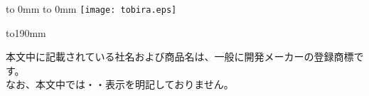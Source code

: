 %
\thispagestyle{empty}
\vbox to 0mm{\vspace*{-27.5truemm}
\hbox to 0mm{
\hspace*{-23.8truemm}\texttt{[image: tobira.eps]}
}\vss}


\pagebreak

%
\thispagestyle{frontheadings}

\vbox to190mm{
\vfil
\begin{minipage}[b]{112mm}
%
\begin{spacing}{1.0}
\begin{small}
本文中に記載されている社名および商品名は、一般に開発メーカーの登録商標です。\\
なお、本文中では\texttrademark ・\textcopyright ・\textregistered 表示を明記しておりません。
\end{small}
\end{spacing}
\end{minipage}
}

